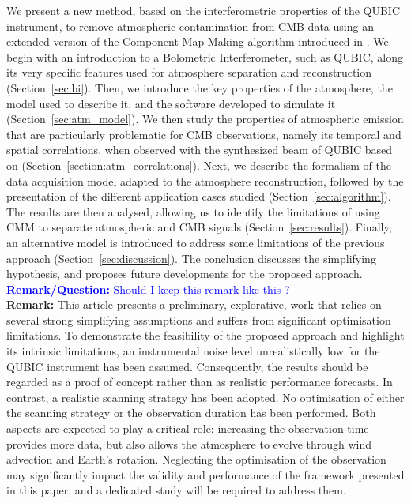 \documentclass[a4paper,11pt]{article}
\newcommand{\rmk}[1]{%
  {\textcolor{blue}{\underline{\textbf{Remark/Question:}} #1}}
}
\begin{document}
We present a new method, based on the interferometric properties of the QUBIC instrument, to remove atmospheric contamination from CMB data using an extended version of the Component Map-Making algorithm introduced in \cite{cmm}. We begin with an introduction to a Bolometric Interferometer, such as QUBIC, along its very specific features used for atmosphere separation and reconstruction (Section~\ref{sec:bi}). Then, we introduce the key properties of the atmosphere, the model used to describe it, and the software developed to simulate it (Section~\ref{sec:atm_model}). We then study the properties of atmospheric emission that are particularly problematic for CMB observations, namely its temporal and spatial correlations, when observed with the synthesized beam of QUBIC based on \cite{errard2015}(Section~\ref{section:atm_correlations}). Next, we describe the formalism of the data acquisition model adapted to the atmosphere reconstruction, followed by the presentation of the different application cases studied (Section~\ref{sec:algorithm}). The results are then analysed, allowing us to identify the limitations of using CMM to separate atmospheric and CMB signals (Section~\ref{sec:results}). Finally, an alternative model is introduced to address some limitations of the previous approach (Section~\ref{sec:discussion}). The conclusion discusses the simplifying hypothesis, and proposes future developments for the proposed approach. \\

\rmk{Should I keep this remark like this ?} \\
\textbf{Remark:} This article presents a preliminary, explorative, work that relies on several strong simplifying assumptions and suffers from significant optimisation limitations. To demonstrate the feasibility of the proposed approach and highlight its intrinsic limitations, an instrumental noise level unrealistically low for the QUBIC instrument has been assumed. Consequently, the results should be regarded as a proof of concept rather than as realistic performance forecasts. In contrast, a realistic scanning strategy has been adopted. No optimisation of either the scanning strategy or the observation duration has been performed. Both aspects are expected to play a critical role: increasing the observation time provides more data, but also allows the atmosphere to evolve through wind advection and Earth's rotation. Neglecting the optimisation of the observation may significantly impact the validity and performance of the framework presented in this paper, and a dedicated study will be required to address them.
\end{document}
